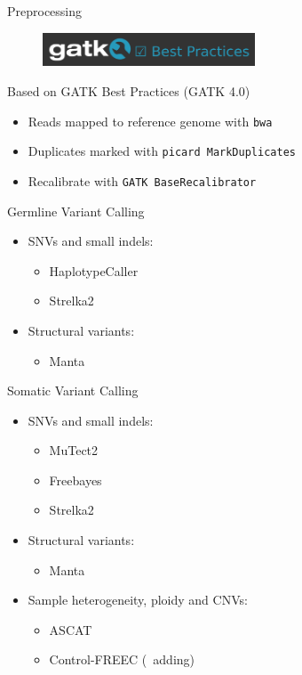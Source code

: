 \documentclass[usepdftitle=false]{beamer}
\begin{document}
\begin{frame}{Preprocessing}
	\begin{figure}
		\includegraphics[height=1cm]{pictures/GATKBP}
	\end{figure}
	Based on GATK Best Practices (GATK 4.0)

	\begin{itemize}
		\item Reads mapped to reference genome with \texttt{bwa}
		\item Duplicates marked with \texttt{picard MarkDuplicates}
		\item Recalibrate with \texttt{GATK BaseRecalibrator}
	\end{itemize}

\end{frame}

\begin{frame}{Germline Variant Calling}
	\begin{itemize}
		\item SNVs and small indels:
	\begin{itemize}
			\item HaplotypeCaller
			\item Strelka2
		\end{itemize}
		\item Structural variants:
		\begin{itemize}
			\item Manta
		\end{itemize}
	\end{itemize}
\end{frame}

\begin{frame}{Somatic Variant Calling}
	\begin{itemize}
		\item SNVs and small indels:
		\begin{itemize}
			\item MuTect2
			\item Freebayes
			\item Strelka2
		\end{itemize}
		\item Structural variants:
		\begin{itemize}
			\item Manta
		\end{itemize}
		\item Sample heterogeneity, ploidy and CNVs:
		\begin{itemize}
			\item ASCAT
			\item Control-FREEC (\faWrench\ adding)
		\end{itemize}
	\end{itemize}
\end{frame}
\end{document}
